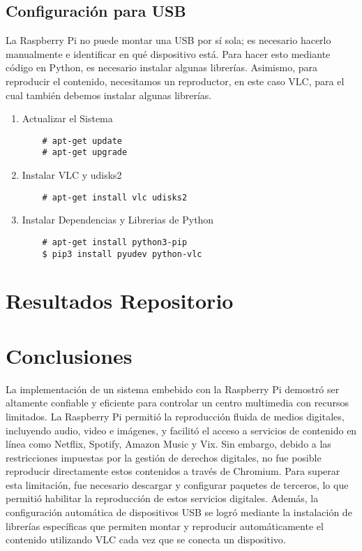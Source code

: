 \documentclass[report,12pt]{article}
\begin{document}
	\subsection{Configuración para USB}
	La Raspberry Pi no puede montar una USB por sí sola; es necesario hacerlo manualmente e identificar en qué dispositivo está. Para hacer esto mediante código en Python, es necesario instalar algunas librerías. Asimismo, para reproducir el contenido, necesitamos un reproductor, en este caso VLC, para el cual también debemos instalar algunas librerías.
	\begin{enumerate} 
	\item Actualizar el Sistema \par
	\vspace{-0.4cm}
	\begingroup
	\color{gray}
	\begin{verbatim}
	# apt-get update
	# apt-get upgrade
	\end{verbatim}
	\endgroup			
	\vspace{-0.5cm}
	\item Instalar VLC y udisks2 \par
	\vspace{-0.4cm}
	\begingroup
	\color{gray}
	\begin{verbatim}
	# apt-get install vlc udisks2
	\end{verbatim}
	\endgroup
	\vspace{-0.8cm}
	\item Instalar Dependencias y Librerias de Python \par
	\vspace{-0.4cm}
	\begingroup
	\color{gray}
	\begin{verbatim}
	# apt-get install python3-pip
	$ pip3 install pyudev python-vlc
	\end{verbatim}
	\endgroup

	\end{enumerate} 

	\section{Resultados Repositorio}
	\section{Conclusiones}
	La implementación de un sistema embebido con la Raspberry Pi demostró ser altamente confiable y eficiente para controlar un centro multimedia con recursos limitados. La Raspberry Pi permitió la reproducción fluida de medios digitales, incluyendo audio, video e imágenes, y facilitó el acceso a servicios de contenido en línea como Netflix, Spotify, Amazon Music y Vix. Sin embargo, debido a las restricciones impuestas por la gestión de derechos digitales, no fue posible reproducir directamente estos contenidos a través de Chromium. Para superar esta limitación, fue necesario descargar y configurar paquetes de terceros, lo que permitió habilitar la reproducción de estos servicios digitales. Además, la configuración automática de dispositivos USB se logró mediante la instalación de librerías específicas que permiten montar y reproducir automáticamente el contenido utilizando VLC cada vez que se conecta un dispositivo. 
\end{document}
